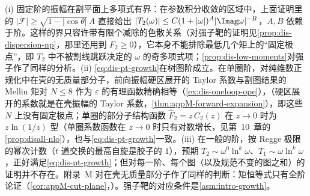 \begin{remark}[部分子增长条件的地位]\label{rem:dis-pt-growth}
(i) 固定阶的振幅在割平面上多项式有界：在参数积分收敛的区域中，上面证明里的 $|\mathcal F|\ge\sqrt{1-|\cos\theta|}\,A$ 直接给出 $|T_2(\omega)|\le C(1+|\omega|)^{A}|\Imag\omega|^{-B}$，$A,B$ 依赖于阶。这样的界只容许带有限个减除的色散关系（对强子靶的证明见\cref{prop:dis-dispersion-np}，那里还用到 $F_2\ge0$），它本身不能排除最低几个矩上的“固定极点”，即 $T_2$ 中不被割线跳跃决定的 $\omega$ 的奇多项式项；\cref{prop:dis-low-moments}对强子作了同样的分析。(ii) \cref{eq:dis-pt-growth}在树图阶成立。在单圈阶，对纯维数正规化中在壳的无质量部分子，前向振幅硬区展开的 Taylor 系数与割图结果的 Mellin 矩对 $N\le8$ 作为 $\varepsilon$ 的有理函数精确相等（\cref{ex:dis-oneloop-ope}），（硬区展开的系数就是在壳振幅的 Taylor 系数，\cref{thm:appM-forward-expansion}），即这些 $N$ 上没有固定极点；单圈的部分子结构函数 $\hat F_2=z\,C_2(z)$ 在 $z\to0$ 时为 $z\ln(1/z)$ 型（单圈系数函数在 $z\to0$ 时只有对数增长，见第~10~章的\cref{prop:disall-nlo}），也与\cref{eq:dis-pt-growth}一致。(iii) 在一般的阶，按 Regge 极限的幂次计数（$t$ 道交换的最高自旋是胶子的 $1$），预期 $T_2\sim\omega^0\ln^k\omega$、$T_1\sim\omega\ln^k\omega$，正好满足\cref{eq:dis-pt-growth}；但对每一阶、每个图（以及规范不变的图之和）的证明并不存在。附录~M 对在壳无质量部分子作了同样的判断：矩恒等式只有全阶论证（\cref{cor:appM-cut-plane}，\tagA）。强子靶的对应条件是\cref{asm:intro-growth}。
\end{remark}

